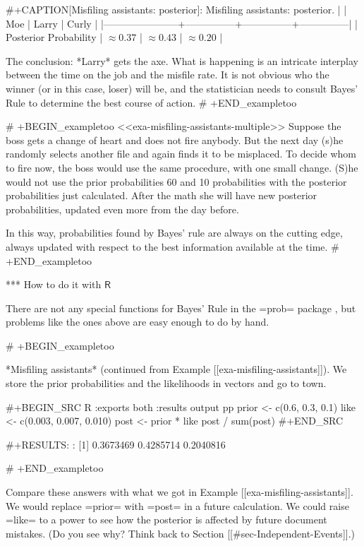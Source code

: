#+CAPTION[Misfiling assistants: posterior]: Misfiling assistants: posterior.
|                       | Moe           | Larry         | Curly         |
|-----------------------+---------------+---------------+---------------|
| Posterior Probability | \(\approx0.37\) | \(\approx0.43\) | \(\approx0.20\) |

The conclusion: *Larry* gets the axe. What is happening is an
intricate interplay between the time on the job and the misfile
rate. It is not obvious who the winner (or in this case, loser) will
be, and the statistician needs to consult Bayes' Rule to determine the
best course of action.
# +END_exampletoo


# +BEGIN_exampletoo
<<exa-misfiling-assistants-multiple>> Suppose the boss gets a change
of heart and does not fire anybody. But the next day (s)he randomly
selects another file and again finds it to be misplaced. To decide
whom to fire now, the boss would use the same procedure, with one
small change. (S)he would not use the prior probabilities 60%
and 10%
probabilities with the posterior probabilities just calculated. After
the math she will have new posterior probabilities, updated even more
from the day before.

In this way, probabilities found by Bayes' rule are always on the
cutting edge, always updated with respect to the best information
available at the time.
# +END_exampletoo

*** How to do it with \(\mathsf{R}\)

There are not any special functions for Bayes' Rule in the =prob=
package \cite{prob}, but problems like the ones above are easy enough
to do by hand.

# +BEGIN_exampletoo

*Misfiling assistants* (continued from Example [[exa-misfiling-assistants]]). We store the prior probabilities and the likelihoods in
vectors and go to town.

#+BEGIN_SRC R :exports both :results output pp  
prior <- c(0.6, 0.3, 0.1)
like <- c(0.003, 0.007, 0.010)
post <- prior * like
post / sum(post)
#+END_SRC

#+RESULTS:
: [1] 0.3673469 0.4285714 0.2040816

# +END_exampletoo

Compare these answers with what we got in Example [[exa-misfiling-assistants]]. We would replace =prior= with =post= in a future
calculation. We could raise =like= to a power to see how the posterior
is affected by future document mistakes. (Do you see why? Think back
to Section [[#sec-Independent-Events]].)


